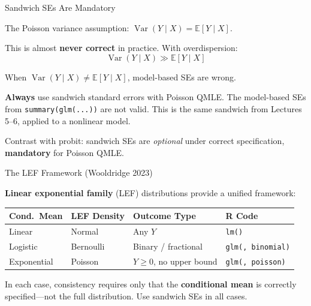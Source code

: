 \documentclass[aspectratio=169, handout, t]{beamer}
\numberwithin{equation}{section}
\begin{document}
\begin{frame}{Sandwich SEs Are Mandatory}

The Poisson variance assumption: $\operatorname{Var}(Y \mid X) = \mathbb{E}[Y \mid X]$.

\pause

\medskip

This is almost \textbf{never correct} in practice. With overdispersion:
\[
\operatorname{Var}(Y \mid X) \gg \mathbb{E}[Y \mid X]
\]

\pause

When $\operatorname{Var}(Y\mid X) \neq \mathbb{E}[Y \mid X]$, model-based SEs are wrong.

\pause

\medskip

\begin{tcolorbox}[colback=blue!5, colframe=blue!50, title=Practical Rule, boxsep=2pt, top=2pt, bottom=2pt]
\textbf{Always} use sandwich standard errors with Poisson QMLE. The model-based SEs from \texttt{summary(glm(...))} are not valid.
This is the same sandwich from Lectures 5--6, applied to a nonlinear model.
\end{tcolorbox}

\pause

\smallskip

Contrast with probit: sandwich SEs are \emph{optional} under correct specification, \textbf{mandatory} for Poisson QMLE.

\end{frame}


\begin{frame}{The LEF Framework (Wooldridge 2023)}

\textbf{Linear exponential family} (LEF) distributions provide a unified framework:

\bigskip

\renewcommand{\arraystretch}{1.4}
\begin{tabular}{llll}
\toprule
\textbf{Cond.\ Mean} & \textbf{LEF Density} & \textbf{Outcome Type} & \textbf{R Code} \\
\midrule
Linear & Normal & Any $Y$ & \texttt{lm()} \\
Logistic & Bernoulli & Binary / fractional & \texttt{glm(, binomial)} \\
Exponential & Poisson & $Y \geq 0$, no upper bound & \texttt{glm(, poisson)} \\
\bottomrule
\end{tabular}
\renewcommand{\arraystretch}{1.0}

\pause

\bigskip

\begin{tcolorbox}[colback=blue!5, colframe=blue!50, boxsep=2pt, top=2pt, bottom=2pt]
In each case, consistency requires only that the \textbf{conditional mean} is correctly specified---not the full distribution. Use sandwich SEs in all cases.
\end{tcolorbox}

\end{frame}
\end{document}
